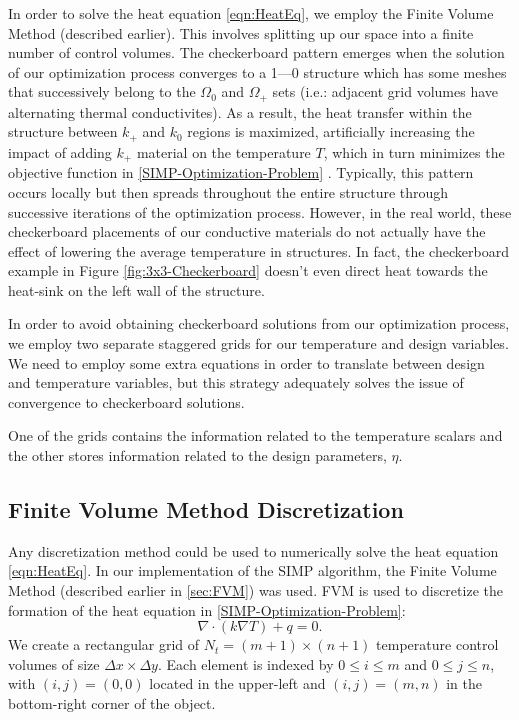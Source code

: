In order to solve the heat equation \eqref{eqn:HeatEq}, we employ the Finite Volume Method (described earlier). This involves splitting up our space into a finite number of control volumes. The checkerboard pattern emerges when the solution of our optimization process converges to a 1---0 structure which has some meshes that successively belong to the $\Omega_0$ and $\Omega_+$ sets (i.e.: adjacent grid volumes have alternating thermal conductivites). As a result, the heat transfer within the structure between $k_+$ and $k_0$ regions is maximized, artificially increasing the impact of adding $k_+$ material on the temperature $T$, which in turn minimizes the objective function in \eqref{SIMP-Optimization-Problem} \cite[]{Versteeg2007}. Typically, this pattern occurs locally but then spreads throughout the entire structure through successive iterations of the optimization process. However, in the real world, these checkerboard placements of our conductive materials do not actually have the effect of lowering the average temperature in structures. In fact, the checkerboard example in Figure \ref{fig:3x3-Checkerboard} doesn't even direct heat towards the heat-sink on the left wall of the structure.

In order to avoid obtaining checkerboard solutions from our optimization process, we employ two separate staggered grids for our temperature and design variables. We need to employ some extra equations in order to translate between design and temperature variables, but this strategy adequately solves the issue of convergence to checkerboard solutions.

\begin{figure}
	\centering
	\caption[Design \& Temperature Grids]{}
\end{figure}

One of the grids contains the information related to the temperature scalars and the other stores information related to the design parameters, $\eta$.

\subsection{Finite Volume Method Discretization}

Any discretization method could be used to numerically solve the heat equation \eqref{eqn:HeatEq}. In our implementation of the SIMP algorithm, the Finite Volume Method (described earlier in \ref{sec:FVM}) was used. FVM is used to discretize the formation of the heat equation in \eqref{SIMP-Optimization-Problem}:
\begin{equation}
	\nabla\cdot\left(k\nabla T\right)+q=0\label{eqn:SIMP-Heat-Eq}.
\end{equation}
We create a rectangular grid of $N_t=(m+1)\times(n+1)$ temperature control volumes of size $\Delta x\times\Delta y$. Each element is indexed by $0\leq i\leq m$ and $0\leq j\leq n$, with $(i,j)=(0,0)$ located in the upper-left and $(i,j)=(m,n)$ in the bottom-right corner of the object.